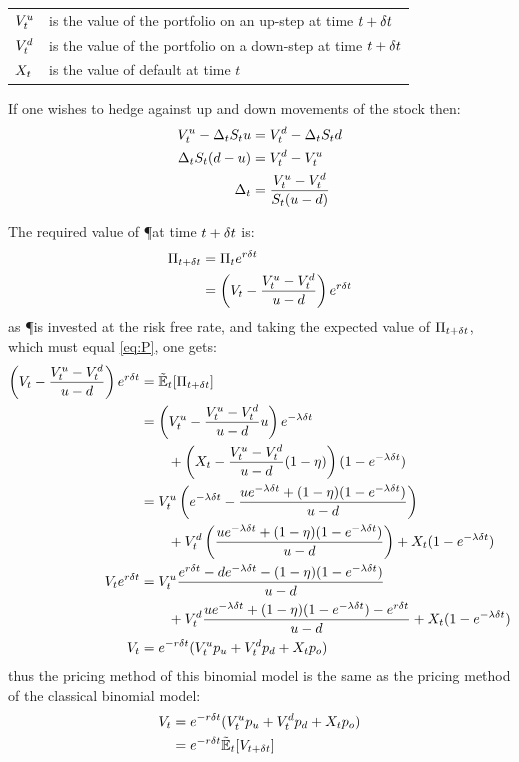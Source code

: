 \documentclass[a4paper,11pt,oneside]{report}
\theoremstyle{plain}
\theoremstyle{definition}
\begin{document}
\begin{tabular}{ll}
 $V^{u}_t$          & is the value of the portfolio on an up-step at time $t + \delta t$ \\
 $V^{d}_t$          & is the value of the portfolio on a down-step at time $t + \delta t$ \\
 $X_t$           & is the value of default at time $t$ \\
\end{tabular}

If one wishes to hedge against up and down movements of the stock then:
\begin{align}
    V^{u}_t - \Delta_tS_t u &= V^{d}_t - \Delta_tS_t d \nonumber\\
     \Delta_tS_t(d - u) &= V^{d}_t - V^{u}_t \nonumber\\
              \Delta_t &= \frac{V^{u}_t - V^{d}_t}{S_t(u - d)}
\end{align}

The required value of \P at time $t + \delta t$ is:
\begin{align}
 \Pi_{t + \delta t}  &= \Pi_t e^{r\delta t} \nonumber\\
       &= \left(V_t - \frac{V^{u}_t - V^{d}_t}{u - d}\right) e^{r\delta t} \label{eq:P}
\end{align}
as \P is invested at the risk free rate, and taking the expected value of $\Pi_{t + \delta t}$, which must equal \eqref{eq:P}, one gets:
\begin{align}
 \left(\V - \frac{\Vu - \Vd}{u - d}\right) e^{r\Dt} &= \Et[\PDt] \n
        &= \left(\Vu - \frac{\Vu - \Vd}{u - d}u\right) e^{-\lambda\Dt} \n
        &\qquad + \left(\X - \frac{\Vu - \Vd}{u - d}(1 - \eta)\right)(1 - e^{-\lambda\Dt}) \n
        &= \Vu\left(e^{-\lambda\Dt} - \frac{ue^{-\lambda\Dt} + (1 - \eta)(1 - e^{-\lambda\Dt})}{u - d}\right) \n
        &\qquad + \Vd\left(\frac{ue^{-\lambda\Dt} + (1 - \eta)(1 - e^{-\lambda\Dt})}{u - d}\right) + \X(1 - e^{-\lambda\Dt}) \n
 \V e^{r\Dt} &= \Vu\frac{e^{r\Dt} - de^{-\lambda\Dt} - (1 - \eta)(1 - e^{-\lambda\Dt})}{u - d} \n
        &\qquad + \Vd\frac{ue^{-\lambda\Dt} + (1 - \eta)(1 - e^{-\lambda\Dt}) - e^{r\Dt}}{u - d} + \X(1 - e^{-\lambda\Dt}) \n
 \V     &= e^{-r\Dt}(\Vu\pu + \Vd\pd + \X\po)
\end{align}
thus the pricing method of this binomial model is the same as the pricing method of the classical binomial model:
\begin{align}
 V_t    &= e^{-r\Dt}(\Vu\pu + \Vd\pd + \X\po) \n
        &= e^{-r\Dt}\Et[V_{t + \Dt}]
\end{align}

\end{document}
